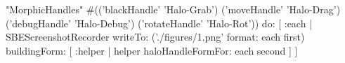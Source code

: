 \newcommand{\figlabel}[1]{\label{fig:#1}}
\newcommand{\seclabel}[1]{\label{sec:#1}}
\newcommand{\menu}[1]{{%
	\setlength{\fboxsep}{0pt}%
	\colorbox{lightgray}{{{\upshape\sffamily\strut \,#1\,}}}}}
\newcommand{\link}[1]{{%
	\fontfamily{lmr}\selectfont
 	\upshape{\sffamily \underline{#1}}}}
\newcommand{\go}{\,$\triangleright$\,}
\newcommand{\short}[1]{\mbox{{\sc cmd}\hspace{0.08em}--\hspace{0.09em}#1}\xspace}
\newcommand{\button}[1]{{%
	\setlength{\fboxsep}{0pt}%
	\fbox{{\upshape\sffamily\strut \,#1\,}}}}
\newcommand{\toolsflap}{\textit{Tools} flap\xspace}
%
\newcommand{\dothisicon}{\raisebox{-.5ex}{\texttt{[image: squeak-logo]}}}
\newcommand{\dothis}[1]{%
	\medskip
	\noindent\dothisicon
	\ifx#1\empty\else\quad\emph{#1}\fi
	\par\smallskip\nopagebreak}
%
\newcommand{\hint}[1]{\vspace{1ex}\noindent\fbox{\textsc{Hint}} \emph{#1}}
\begin{ExecuteSmalltalkScript}
"MorphicHandles"
#(('blackHandle' 'Halo-Grab') ('moveHandle' 'Halo-Drag') ('debugHandle' 'Halo-Debug') ('rotateHandle' 'Halo-Rot'))
	do: [ :each |
		SBEScreenshotRecorder
			writeTo: ('./figures/{1}.png' format: {each first})
			buildingForm: [ :helper |
				helper haloHandleFormFor: each second ] ]
\end{ExecuteSmalltalkScript}
\usepackage{textcomp}  %
\usepackage{scalerel}  %
\newcommand{\haloHandle}[1]{\scalerel*{\texttt{[image: \#1]}}{\textrm{\textbigcircle}}}
